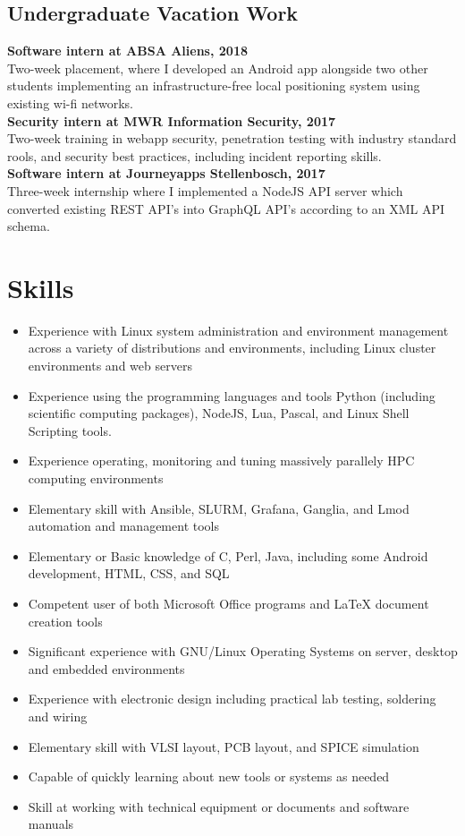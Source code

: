 \documentclass[10pt,a4paper,notitlepage]{article}
\begin{document}
\subsection*{Undergraduate Vacation Work}
\begin{spacing}{1.1}
\textbf{Software intern at ABSA Aliens, 2018}\\
Two-week placement, where I developed an Android app alongside two other students implementing an
infrastructure-free local positioning system using existing wi-fi networks. 
    \vspace*{0.5em}\\
\textbf{Security intern at MWR Information Security, 2017}\\
Two-week training in webapp security, penetration testing with industry standard rools, and security
best practices, including incident reporting skills.
    \vspace*{0.5em}\\
\textbf{Software intern at Journeyapps Stellenbosch, 2017}\\
Three-week internship where I implemented a NodeJS API server which converted existing REST API's
into GraphQL API's according to an XML API schema.
\end{spacing}

\section*{Skills}
\begin{itemize}[noitemsep]
	\setlength\itemsep{0.02em}
    \item Experience with Linux system administration and environment management across a variety of distributions and environments, including Linux cluster environments and web servers
    \item Experience using the programming languages and tools Python (including scientific computing packages), NodeJS, Lua, Pascal, and Linux Shell Scripting tools.
    \item Experience operating, monitoring and tuning massively parallely HPC computing environments
    \item Elementary skill with Ansible, SLURM, Grafana, Ganglia, and Lmod automation and management tools
    \item Elementary or Basic knowledge of C, Perl, Java, including some Android development, HTML, CSS, and SQL
    \item Competent user of both Microsoft Office programs and LaTeX document creation tools
    \item Significant experience with GNU/Linux Operating Systems on server, desktop and embedded environments
    \item Experience with electronic design including practical lab testing, soldering and wiring
    \item Elementary skill with VLSI layout, PCB layout, and SPICE simulation
    \item Capable of quickly learning about new tools or systems as needed
    \item Skill at working with technical equipment or documents and software manuals
\end{itemize}
\end{document}
